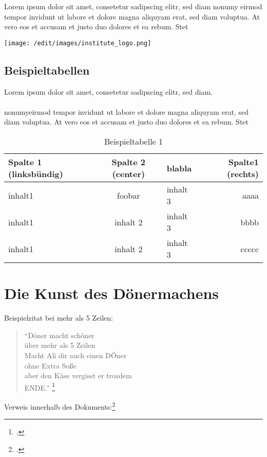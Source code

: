 Lorem ipsum dolor sit amet, consetetur sadipscing elitr, sed diam nonumy eirmod tempor invidunt ut labore et dolore magna aliquyam erat, sed diam voluptua. At vero eos et accusam et justo duo dolores et ea rebum. Stet
\begin{center}
	\texttt{[image: /edit/images/institute\_logo.png]}
\end{center}


\clearpage

\subsection{Beispieltabellen}
Lorem ipsum dolor sit amet, consetetur sadipscing elitr, sed diam.\\\\
 nonumyeirmod tempor invidunt ut labore et dolore magna aliquyam erat, sed diam voluptua. At vero eos et accusam et justo duo dolores et ea rebum. Stet


\begin{table}[h]
\begin{tabularx}{\textwidth}{|l|c|X|r|}
	\hline
	\textbf{Spalte 1} (linksbündig) & \textbf{Spalte 2} (center) &
	blabla & \textbf{Spalte1} (rechts) \\
	\hline
	\hline
	inhalt1 & foobar & inhalt 3 & aaaa \\
	\hline
	inhalt1 & inhalt 2 & inhalt 3 & bbbb \\
	\hline
	inhalt1 & inhalt 2 & inhalt 3 & ccccc \\
	\hline
\end{tabularx}
\caption{Beispieltabelle 1}
\end{table}


\section{Die Kunst des Dönermachens}

Beispielzitat bei mehr als 5 Zeilen:
\begin{quote}
"`Döner macht schöner\\
über mehr als 5 Zeilen\\
Macht Ali dir auch einen DÖner \\
ohne Extra Soße \\
aber den Käse vergisst er trozdem\\
ENDE."'
\footcite[Wörtlich übernommen von Ali]{praxishandbuch:bpmn2}
\end{quote}
Verweis innerhalb des Dokuments:\footcite[Vgl. \ref{Referenz} auf Seite
\pageref{Referenz} ]{empty}


